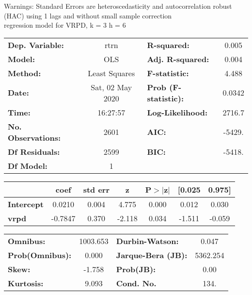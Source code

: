 Warnings: \newline
 [1] Standard Errors are heteroscedasticity and autocorrelation robust (HAC) using 1 lags and without small sample correction\\ 

regression model for VRPD, k = 3 h = 6\begin{center}
\begin{tabular}{lclc}
\toprule
\textbf{Dep. Variable:}    &       rtrn       & \textbf{  R-squared:         } &     0.005   \\
\textbf{Model:}            &       OLS        & \textbf{  Adj. R-squared:    } &     0.004   \\
\textbf{Method:}           &  Least Squares   & \textbf{  F-statistic:       } &     4.488   \\
\textbf{Date:}             & Sat, 02 May 2020 & \textbf{  Prob (F-statistic):} &   0.0342    \\
\textbf{Time:}             &     16:27:57     & \textbf{  Log-Likelihood:    } &    2716.7   \\
\textbf{No. Observations:} &        2601      & \textbf{  AIC:               } &    -5429.   \\
\textbf{Df Residuals:}     &        2599      & \textbf{  BIC:               } &    -5418.   \\
\textbf{Df Model:}         &           1      & \textbf{                     } &             \\
\bottomrule
\end{tabular}
\begin{tabular}{lcccccc}
                   & \textbf{coef} & \textbf{std err} & \textbf{z} & \textbf{P$> |$z$|$} & \textbf{[0.025} & \textbf{0.975]}  \\
\midrule
\textbf{Intercept} &       0.0210  &        0.004     &     4.775  &         0.000        &        0.012    &        0.030     \\
\textbf{vrpd}      &      -0.7847  &        0.370     &    -2.118  &         0.034        &       -1.511    &       -0.059     \\
\bottomrule
\end{tabular}
\begin{tabular}{lclc}
\textbf{Omnibus:}       & 1003.653 & \textbf{  Durbin-Watson:     } &    0.047  \\
\textbf{Prob(Omnibus):} &   0.000  & \textbf{  Jarque-Bera (JB):  } & 5362.254  \\
\textbf{Skew:}          &  -1.758  & \textbf{  Prob(JB):          } &     0.00  \\
\textbf{Kurtosis:}      &   9.093  & \textbf{  Cond. No.          } &     134.  \\
\bottomrule
\end{tabular}
\end{center}


